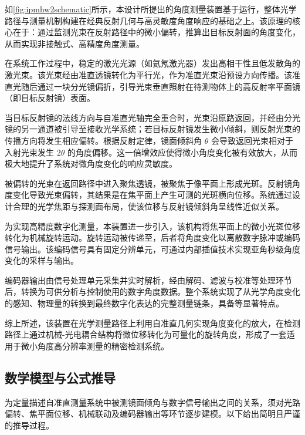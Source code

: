 如\cref{fig:ipmhw2schematic}所示，本设计所提出的角度测量装置基于运行，整体光学路径与测量机制构建在经典反射几何与高灵敏度角度响应的基础之上。该原理的核心在于：通过监测光束在反射路径中的微小偏转，推算出目标反射面的角度变化，从而实现非接触式、高精度角度测量。

在系统工作过程中，稳定的激光光源（如氦氖激光器）发出高相干性且低发散角的激光束。该光束经由准直透镜转化为平行光，作为准直光束沿预设方向传播。该准直光随后通过一块分光镜偏折，引导光束垂直照射在待测物体上的高反射率平面镜（即目标反射镜）表面。

当目标反射镜的法线方向与自准直光轴完全重合时，光束沿原路返回，并经由分光镜的另一通道被引导至接收光学系统；若目标反射镜发生微小倾斜，则反射光束的传播方向将发生相应偏转。根据反射定律，镜面倾斜角 $\theta$ 会导致返回光束相对于入射光束发生 $2\theta$ 的角度偏移。这一倍增效应使得微小角度变化被有效放大，从而极大地提升了系统对微角度变化的响应灵敏度。

被偏转的光束在返回路径中进入聚焦透镜，被聚焦于像平面上形成光斑。反射镜角度变化导致光束偏转，其结果是在焦平面上产生可测的光斑横向位移。系统通过设计合理的光学焦距与探测面布局，使该位移与反射镜倾斜角呈线性近似关系。

为实现高精度数字化测量，本装置进一步引入，该机构将焦平面上的微小光斑位移转化为机械旋转运动。旋转运动被传递至，后者将角度变化以离散数字脉冲或编码信号输出。该编码信号具有固定分辨单元，可通过内部插值技术实现亚角秒级角度变化的采样与输出。

编码器输出由信号处理单元采集并实时解析，经由解码、滤波与校准等处理环节后，转换为可供分析与控制使用的数字角度数据。整个系统实现了从光学角度变化的感知、物理量的转换到最终数字化表达的完整测量链条，具备等显著特点。

综上所述，该装置在光学测量路径上利用自准直几何实现角度变化的放大，在检测路径上通过机械-光电耦合结构将微位移转化为可量化的旋转角度，形成了一套适用于微小角度高分辨率测量的精密检测系统。

\subsection{数学模型与公式推导}

为定量描述自准直测量系统中被测镜面倾角与数字信号输出之间的关系，须对光路偏转、焦平面位移、机械联动及编码器输出等环节逐步建模。以下给出简明且严谨的推导过程。

